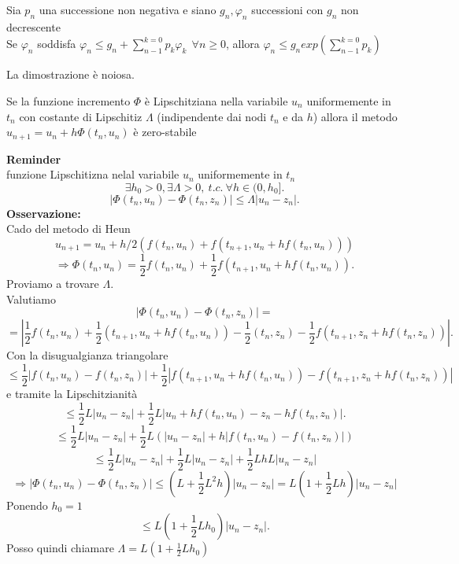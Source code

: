 \documentclass[12px]{article}
\begin{document}
	\begin{lemm}
		Sia $p_n$ una successione non negativa e siano $g_n, \varphi_n$ successioni con $g_n$ non decrescente\\
		Se  $ \varphi_n$ soddisfa $ \varphi_n\leq g_n + \sum^{k=0}_{n-1}p_k \varphi_k\ \ \forall n\geq 0$, allora $ \varphi_n \leq g_n exp( \sum^{k=0}_{n-1}p_k )$
	\end{lemm}
	La dimostrazione è noiosa.\\
	\begin{teo}
		Se la funzione incremento $ \Phi$ è Lipschitziana nella variabile $u_n$ uniformemente in  $t_n$ con costante di Lipschitiz  $\Lambda$ (indipendente dai nodi  $t_n$ e da $h$) allora il metodo  $u_{n+1} = u_n + h\Phi(t_n,u_n)$ è zero-stabile
	\end{teo}
	\textbf{Reminder}\\
	funzione Lipschitizna nelal variabile $u_n$ uniformemente in $t_n$
	\[
		\exists h_0 > 0, \exists \Lambda > 0, \ t.c. \ \forall h\in (0,h_0]
	.\] 
	 \[
	|\Phi(t_n,u_n) - \Phi(t_n,z_n)| \leq \Lambda |u_n - z_n|
	.\] 
	\textbf{Osservazione:}\\
	Cado del metodo di Heun
	\[
		u_{n+1} = u_n + h/2(f(t_n,u_n) + f(t_{n+1},u_n + hf(t_n,u_n)))
	\] 
	\[
		\Rightarrow  \Phi(t_n,u_n) = \frac 12 f(t_n,u_n) + \frac 12 f(t_{n+1},u_n + h f(t_n,u_n))
	.\] 
	Proviamo a trovare $\Lambda$.\\
	Valutiamo
	 \[
	 | \Phi(t_n,u_n)- \Phi(t_n,z_n)| = \]\[=\left|\frac 12 f(t_n,u_n) + \frac 12 (t_{n+1},u_n + h f ( t_n,u_n)) - \frac 12 (t_n,z_n) - \frac 12 f(t_{n+1},z_n + h f(t_n,z_n))\right|
	.\] 
	Con la disugualgianza triangolare
	\[
		\leq \frac 12 \left| f(t_n,u_n)-f(t_n,z_n)\right| + \frac 12 \left| f(t_{n+1},u_n+ hf(t_n,u_n)) - f(t_{n+1},z_n+hf(t_n,z_n))\right|
	\] 
	e tramite la Lipschitzianità
	\[
	\leq \frac 12 L|u_n-z_n| + \frac 12 L |u_n + hf(t_n,u_n)-z_n-hf(t_n,z_n)|
	.\] 
	\[
	\leq \frac 12 L|u_n-z_n| + \frac 12 L(|u_n-z_n| + h |f(t_n,u_n) - f(t_n,z_n)|)
	\] 
	\[
	\leq \frac 12 L|u_n-z_n| + \frac 12 L|u_n-z_n| + \frac 12 LhL|u_n-z_n|
	\] 
	\[
	\Rightarrow  |\Phi(t_n,u_n)-\Phi(t_n,z_n)|\leq (L + \frac 12 L^2h)|u_n-z_n| = L(1+\frac 12 Lh)|u_n-z_n|
	\] 
	Ponendo $h_0 = 1$
	\[
	\leq L(1 + \frac 12 L h_0)|u_n-z_n|
	.\] 
	Posso quindi chiamare $\Lambda = L(1 + \frac 12 Lh_0)$
\end{document}
